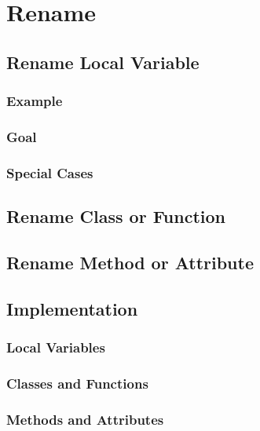 \documentclass[12pt,halfparskip]{scrreprt}
\begin{document}
\section{Rename}


\subsection{Rename Local Variable}


\subsubsection{Example}

\subsubsection{Goal}

\subsubsection{Special Cases}


\subsection{Rename Class or Function}


\subsection{Rename Method or Attribute}


\subsection{Implementation}


\subsubsection{Local Variables}


\subsubsection{Classes and Functions}


\subsubsection{Methods and Attributes}
\end{document}
